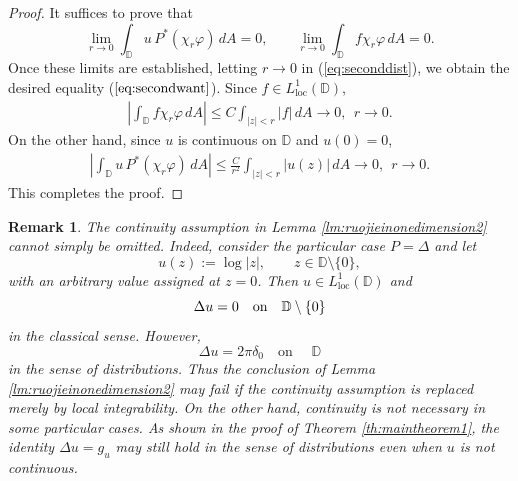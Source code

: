 \documentclass[12pt,twoside]{amsart}
\newcommand{\D}{\ensuremath{\mathbb{D}}}
\numberwithin{equation}{section}
\numberwithin{definition}{section} %
\newtheorem{remark}{Remark}
\begin{document}
\begin{proof}
It suffices to prove that
\[
\lim_{r\to 0}\int_{\mathbb D} u\,P^*(\chi_r\varphi)\,dA=0,
\qquad
\lim_{r\to 0}\int_{\mathbb D} f\chi_r\varphi\,dA=0.
\]
Once these limits are established, letting $r\rightarrow 0$ in (\ref{eq:seconddist}), we obtain the desired equality ($\ref{eq:secondwant}$). Since $f\in L^1_{\mathrm{loc}}(\mathbb D)$,
\begin{align*}
\left |\int_{ \D}  f \chi _r \varphi\,dA  \right| \leq C  \int _{|z|<r} |f|\,dA  \rightarrow 0,  \ \   r\rightarrow 0.
\end{align*}
On the other hand,   since $u$ is continuous on $\D$ and $u(0)=0$,
\begin{align*}
\left|\int_{\mathbb D}u\,P^*(\chi_r\varphi)\,dA\right|\le \frac{C}{r^2}\int_{|z|<r}|u(z)|\,dA   \rightarrow 0,  \ \   r\rightarrow 0.
\end{align*}
This completes the proof.
\end{proof}







\begin{remark}
The continuity assumption in Lemma \ref{lm:ruojieinonedimension2} cannot simply be omitted. Indeed, consider the particular case $P=\Delta$ and let
\[
u(z):=\log |z|,\qquad z\in\mathbb D\setminus\{0\},
\]
with an arbitrary value assigned at $z=0$. Then $u\in L^1_{\mathrm{loc}}(\mathbb D)$ and
\[
\Delta u=0 \quad \text{on} \quad \mathbb  \D \setminus \{ 0\}
\]
in the classical sense. However,
\[
\Delta u=2\pi\delta_0 \quad\text{on }\quad \mathbb D
\]
in the sense of distributions. Thus the conclusion of Lemma \ref{lm:ruojieinonedimension2} may fail if the continuity assumption is replaced merely by local integrability. On the other hand, continuity is not necessary in some particular cases. As shown in the proof of Theorem \ref{th:maintheorem1}, the identity
 $
\Delta u=g_u
 $
may still hold in the sense of distributions even when  $u $ is not continuous.
\end{remark}
\end{document}
